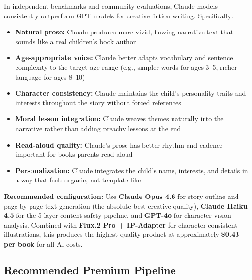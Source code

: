 \documentclass[12pt, letterpaper, oneside]{book}
\begin{document}
In independent benchmarks and community evaluations, Claude models consistently outperform GPT models for creative fiction writing. Specifically:

\begin{itemize}[leftmargin=2em, itemsep=2pt]
  \item \textbf{Natural prose:} Claude produces more vivid, flowing narrative text that sounds like a real children's book author
  \item \textbf{Age-appropriate voice:} Claude better adapts vocabulary and sentence complexity to the target age range (e.g., simpler words for ages 3--5, richer language for ages 8--10)
  \item \textbf{Character consistency:} Claude maintains the child's personality traits and interests throughout the story without forced references
  \item \textbf{Moral lesson integration:} Claude weaves themes naturally into the narrative rather than adding preachy lessons at the end
  \item \textbf{Read-aloud quality:} Claude's prose has better rhythm and cadence---important for books parents read aloud
  \item \textbf{Personalization:} Claude integrates the child's name, interests, and details in a way that feels organic, not template-like
\end{itemize}

\begin{successbox}
\textbf{Recommended configuration:} Use \textbf{Claude Opus 4.6} for story outline and page-by-page text generation (the absolute best creative quality), \textbf{Claude Haiku 4.5} for the 5-layer content safety pipeline, and \textbf{GPT-4o} for character vision analysis. Combined with \textbf{Flux.2 Pro + IP-Adapter} for character-consistent illustrations, this produces the highest-quality product at approximately \textbf{\$0.43 per book} for all AI costs.
\end{successbox}

\subsection{Recommended Premium Pipeline}
\end{document}
